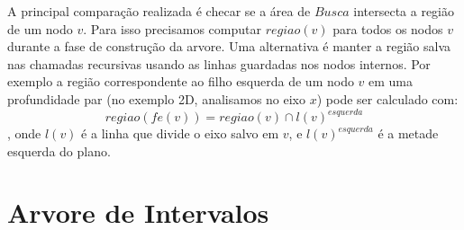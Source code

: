 A principal comparação realizada é checar se a área de \(Busca\) intersecta a região
de um nodo \(v\). Para isso precisamos computar \(regiao(v)\) para todos os nodos \(v\)
durante a fase de construção da arvore.
Uma alternativa é manter a região salva nas chamadas recursivas usando as linhas guardadas
nos nodos internos. Por exemplo a região correspondente ao filho esquerda de um nodo
\(v\) em uma profundidade par (no exemplo 2D, analisamos no eixo \(x\)) pode ser calculado com:
\[
    regiao(fe(v)) = regiao(v) \cap l(v)^{esquerda}
\],
onde \(l(v)\) é a linha que divide o eixo salvo em \(v\), e \(l(v)^{esquerda}\) é a metade
esquerda do plano.


\section{Arvore de Intervalos}



